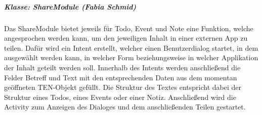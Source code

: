 \subparagraph*{Klasse: ShareModule (Fabia Schmid)}
Das ShareModule bietet jeweils für Todo, Event und Note eine Funktion, welche angesprochen werden kann, um den jeweiligen Inhalt in einer externen App zu teilen. Dafür wird ein Intent erstellt, welcher einen Benutzerdialog startet, in dem ausgewählt werden kann, in welcher Form beziehungsweise in welcher Applikation der Inhalt geteilt werden soll. Innerhalb des Intents werden anschließend die Felder Betreff und Text mit den entsprechenden Daten aus dem momentan geöffneten TEN-Objekt gefüllt. Die Struktur des Textes entspricht dabei der Struktur eines Todos, eines Events oder einer Notiz. Anschließend wird die Activity zum Anzeigen des Dialoges und dem anschließenden Teilen gestartet.




